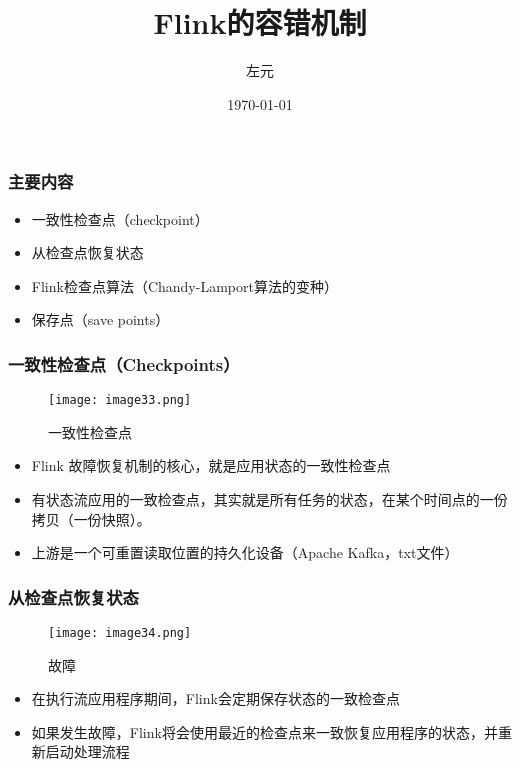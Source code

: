 \documentclass{beamer}
\title{Flink的容错机制}
\date{\today}
\author{左元}
\institute{尚硅谷 大数据组}
\begin{document}
  \maketitle
  \begin{frame}
    \frametitle{主要内容}

    \begin{itemize}
        \item 一致性检查点（checkpoint）
        \item 从检查点恢复状态
        \item Flink检查点算法（Chandy-Lamport算法的变种）
        \item 保存点（save points）
    \end{itemize}
  
  \end{frame}

  \begin{frame}
      \frametitle{一致性检查点（Checkpoints）}

      \begin{figure}
        \centering
        \texttt{[image: image33.png]}
        \caption{一致性检查点}
      \end{figure}
  
      \begin{itemize}
          \item Flink 故障恢复机制的核心，就是应用状态的一致性检查点
          \item 有状态流应用的一致检查点，其实就是所有任务的状态，在某个时间点的一份拷贝（一份快照）。
          \item 上游是一个可重置读取位置的持久化设备（Apache Kafka，txt文件）
      \end{itemize}
  
  \end{frame}

  \begin{frame}
      \frametitle{从检查点恢复状态}

      \begin{figure}
        \centering
        \texttt{[image: image34.png]}
        \caption{故障}
      \end{figure}
  
      \begin{itemize}
          \item 在执行流应用程序期间，Flink会定期保存状态的一致检查点
          \item 如果发生故障，Flink将会使用最近的检查点来一致恢复应用程序的状态，并重新启动处理流程
      \end{itemize}
  
  \end{frame}
\end{document}
